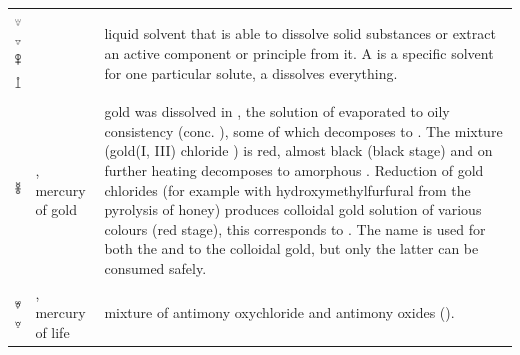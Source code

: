 \documentclass[british,final,landscape]{scrartcl}
\begin{document}
\begin{refsection}
\begin{supertabular}{p{0.3\textwidth}p{0.34\textwidth}p{0.34\textwidth}}
   \includegraphics[width=5mm]{Mixtures/Menstruum} \includegraphics[width=5mm]{Mixtures/Menstruum2} \includegraphics[height=5mm]{Mixtures/Menstruum3} \includegraphics[height=5mm]{Mixtures/Menstruum4} &  & liquid solvent that is able to dissolve solid substances or extract an active component or principle from it. A  is a specific solvent for one particular solute, a  dissolves everything. \\
   \includegraphics[height=5mm]{Mixtures/MercuryOfGold} & , mercury of gold & gold was dissolved in , the solution of  evaporated to oily consistency (conc. ), some of which decomposes to . The mixture (gold(I, III) chloride ) is red, almost black (black stage) and on further heating decomposes to amorphous . Reduction of gold chlorides (for example with hydroxymethylfurfural from the pyrolysis of honey) produces colloidal gold solution of various colours (red stage), this corresponds to \parencite{Sou-10, Sou-22}. The name  is used for both the  and to the colloidal gold, but only the latter can be consumed safely.  \\
   \includegraphics[width=5mm]{Mixtures/MercuryOfLife} \includegraphics[width=5mm]{Mixtures/MercuryOfLife2} & , mercury of life & mixture of antimony oxychloride and antimony oxides ().\\

\end{supertabular}
\end{refsection}
\end{document}
